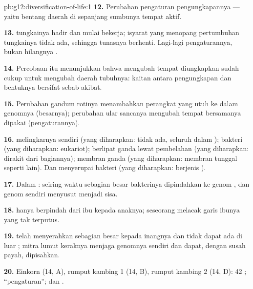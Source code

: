 \begin{solution}{pb:g12:diversification-of-life:1}
\textbf{12.} Perubahan pengaturan pengungkapannya --- yaitu bentang
daerah di sepanjang sumbunya tempat  aktif.

\textbf{13.}  tungkainya hadir dan mulai bekerja; isyarat yang
menopang pertumbuhan tungkainya tidak ada, sehingga tunasnya berhenti.
Lagi-lagi pengaturannya, bukan hilangnya .

\textbf{14.} Percobaan itu menunjukkan bahwa mengubah tempat 
diungkapkan sudah cukup untuk mengubah daerah tubuhnya: kaitan antara
pengungkapan dan bentuknya bersifat sebab akibat.

\textbf{15.} Perubahan gandum rotinya menambahkan perangkat yang utuh
ke dalam genomnya (besarnya); perubahan ular sancanya mengubah tempat
 bersamanya dipakai (pengaturannya).

\textbf{16.}  melingkarnya sendiri (yang diharapkan: tidak ada,
seluruh  dalam );  bakteri (yang diharapkan:
 eukariot); berlipat ganda lewat pembelahan (yang diharapkan:
dirakit dari bagiannya); membran ganda (yang diharapkan: membran
tunggal seperti  lain). Dan  menyerupai  bakteri (yang
diharapkan:  berjenis ).

\textbf{17.} Dalam : seiring waktu sebagian besar 
bakterinya dipindahkan ke genom , dan genom 
sendiri menyusut menjadi sisa.

\textbf{18.}   hanya berpindah dari ibu kepada
anaknya;   seseorang melacak garis ibunya yang tak terputus.

\textbf{19.}  telah menyerahkan sebagian besar 
kepada inangnya dan tidak dapat ada di luar ; mitra lumut
keraknya menjaga genomnya sendiri dan dapat, dengan susah payah, dipisahkan.

\textbf{20.} Einkorn (14, A), rumput kambing 1 (14, B), rumput kambing
2 (14, D): 42 ; ``pengaturan''; dan .
\end{solution}

